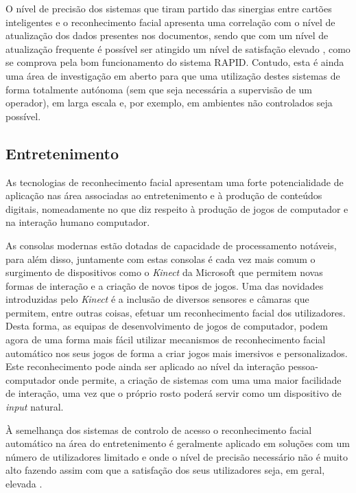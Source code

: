 O nível de precisão dos sistemas que tiram partido das sinergias entre cartões inteligentes e o reconhecimento facial apresenta uma correlação com o nível de atualização dos dados presentes nos documentos, sendo que  com um nível de atualização frequente é possível ser atingido um nível de satisfação elevado \cite{Li2011}, como se comprova pela bom funcionamento do sistema RAPID.
Contudo, esta é ainda uma área de investigação em aberto para que uma utilização destes sistemas de forma totalmente autónoma (sem que seja necessária a supervisão de um operador), em larga escala e, por exemplo, em ambientes não controlados seja possível.

\subsection{Entretenimento} \label{Entretenimento}
As tecnologias de reconhecimento facial apresentam uma forte potencialidade de aplicação nas área associadas ao entretenimento e à produção de conteúdos digitais, nomeadamente no que diz respeito à produção de jogos de computador e na interação humano computador.

As consolas modernas estão dotadas de capacidade de processamento notáveis, para além disso, juntamente com estas consolas é cada vez mais comum o surgimento de dispositivos como o \textit{Kinect} da Microsoft que permitem novas formas de interação e a criação de novos tipos de jogos. Uma das novidades introduzidas pelo \textit{Kinect} é a inclusão de diversos sensores e câmaras que permitem, entre outras coisas, efetuar um reconhecimento facial dos utilizadores. Desta forma, as equipas de desenvolvimento de jogos de computador, podem agora de uma forma mais fácil utilizar mecanismos de reconhecimento facial automático nos seus jogos de forma a criar jogos mais imersivos e personalizados. Este reconhecimento pode ainda ser aplicado ao nível da interação pessoa-computador  onde permite, a criação de sistemas com uma  uma maior facilidade de interação, uma vez que o próprio rosto poderá servir como um dispositivo de \textit{input} natural. 

À semelhança dos sistemas de controlo de acesso o reconhecimento facial automático na área do entretenimento é geralmente aplicado em soluções com um número de utilizadores limitado e onde o nível de precisão necessário não é muito alto fazendo assim com que a satisfação dos seus utilizadores seja, em geral, elevada \cite{Li2011}.


